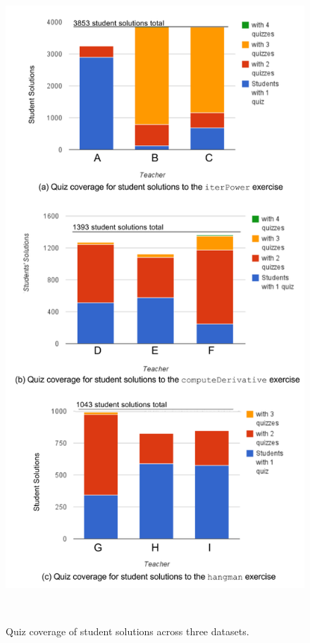 \begin{figure}
\begin{minipage}{1\columnwidth}
\centering
\includegraphics[width=1.0\columnwidth]{Body/figures/foobaz/ComboQuizCoverageFigure2.png}
\caption{Quiz coverage of student solutions across three datasets.}~\label{fig:comboquizcoverage}
\end{minipage}


\end{figure}
